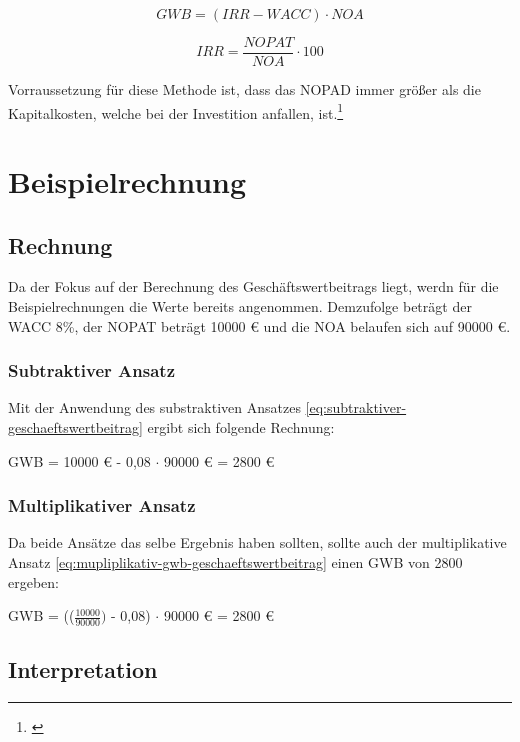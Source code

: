 \begin{equation}
    GWB = (IRR - WACC) \cdot NOA
    \label{eq:mupliplikativ-gwb-geschaeftswertbeitrag}
\end{equation}

\begin{equation}
    IRR = \frac{NOPAT}{NOA} \cdot 100
    \label{eq:mupliplikativ-irr-geschaeftswertbeitrag}
\end{equation}

\bigskip

\noindent
Vorraussetzung für diese Methode ist, dass das NOPAD immer größer als die Kapitalkosten, welche bei der Investition anfallen, ist.\footnote{\cite{bwllexicon-eva}}

\section{Beispielrechnung}

\subsection{Rechnung}

Da der Fokus auf der Berechnung des Geschäftswertbeitrags liegt, werdn für die Beispielrechnungen die Werte bereits angenommen. Demzufolge beträgt der WACC 8\%, der NOPAT beträgt 10000 € und die NOA belaufen sich auf 90000 €.

\subsubsection{Subtraktiver Ansatz}

Mit der Anwendung des substraktiven Ansatzes \eqref{eq:subtraktiver-geschaeftswertbeitrag} ergibt sich folgende Rechnung:

\bigskip
GWB = 10000 € - 0,08 $\cdot$ 90000 € = 2800 €


\subsubsection{Multiplikativer Ansatz}

Da beide Ansätze das selbe Ergebnis haben sollten, sollte auch der multiplikative Ansatz \eqref{eq:mupliplikativ-gwb-geschaeftswertbeitrag} einen GWB von 2800 ergeben:

\bigskip
GWB = (($\frac{10000}{90000})$ - 0,08) $\cdot$ 90000 € = 2800 €

\subsection{Interpretation}

